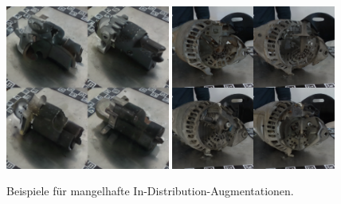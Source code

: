 \begin{figure}[h]
  \centering
  \includegraphics[width=0.48\textwidth]{images/figure_results_id-augs_bad_1.png}%
  \hspace{0.02\textwidth}\includegraphics[width=0.48\textwidth]{figure_results_id-augs_bad_2.png}
  \caption{Beispiele für mangelhafte In-Distribution-Augmentationen.}
  \label{fig:id-augs-bad}
\end{figure}

